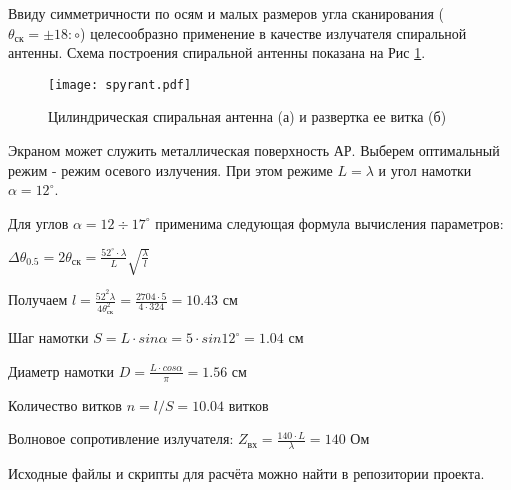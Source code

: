 Ввиду симметричности по осям и малых размеров угла сканирования ($\theta_\text{ск}=\pm18:\circ$) целесообразно применение в качестве излучателя спиральной антенны. Схема построения спиральной антенны показана на Рис \ref{fig:spyrant}. 

\begin{figure}[H]
	\centering
	\texttt{[image: spyrant.pdf]}
	\caption{Цилиндрическая спиральная антенна (а) и развертка ее витка (б)}
	\label{fig:spyrant}
\end{figure}

Экраном может служить металлическая поверхность АР. Выберем оптимальный режим - режим осевого излучения. При этом режиме $L=\lambda$ и угол намотки $\alpha=12^\circ$.

Для углов $\alpha=12\div17^\circ$ применима следующая формула вычисления параметров:

$\displaystyle \Delta\theta_{0.5}=2\theta_\text{ск}=\frac{52^\circ\cdot\lambda}{L}\sqrt{\frac{\lambda}{l}}$

Получаем $\displaystyle l=\frac{52^2\lambda}{4\theta^2_\text{ск}}=\frac{2704\cdot5}{4\cdot324}=10.43 \text{ см}$

Шаг намотки $\displaystyle S=L\cdot sin\alpha=5\cdot sin12^\circ=1.04 \text{ см}$

Диаметр намотки $\displaystyle D=\frac{L\cdot cos\alpha}{\pi}=1.56 \text{ см}$

Количество витков $\displaystyle n=l/S=10.04 \text{ витков}$

Волновое сопротивление излучателя: $\displaystyle Z_\text{вх}=\frac{140\cdot L}{\lambda}=140 \text{ Ом}$


\vfill

{\small \color{gray} Исходные файлы и скрипты для расчёта можно найти в репозитории проекта.}